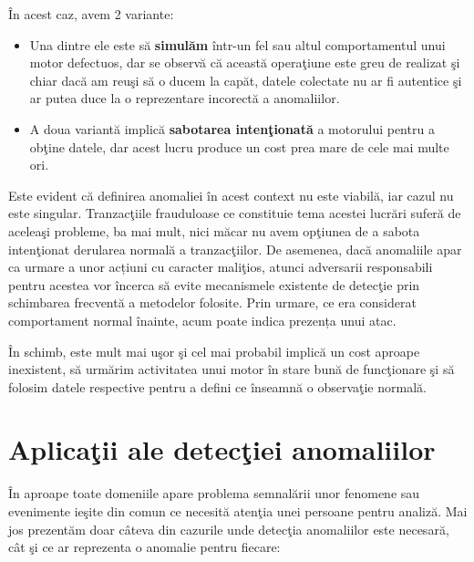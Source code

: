 În acest caz, avem 2 variante:
\begin{itemize}
    \item Una dintre ele 
        este să \textbf{simulăm} 
        într-un fel sau altul comportamentul unui motor defectuos, dar 
        se observă că această operaţiune este greu de realizat şi chiar dacă am reuşi 
        să o ducem la capăt, datele colectate nu ar fi autentice şi ar putea duce 
        la o reprezentare incorectă a anomaliilor. 

    \item A doua variantă implică \textbf{sabotarea 
        intenţionată} a motorului pentru a obţine datele, dar acest lucru produce un 
        cost prea mare de cele mai multe ori. 
\end{itemize}

Este evident că definirea anomaliei în acest context nu este viabilă, iar 
cazul nu este singular. Tranzacţiile frauduloase ce constituie tema acestei lucrări 
suferă de aceleaşi probleme, ba mai mult, nici măcar nu avem opţiunea de a 
sabota intenţionat derularea normală a tranzacţiilor. De asemenea,
dacă anomaliile apar ca urmare a unor acțiuni cu caracter maliţios,
atunci adversarii responsabili pentru acestea vor încerca să 
evite mecanismele existente de detecţie prin schimbarea 
frecventă a metodelor folosite. Prin urmare, ce era considerat
comportament normal înainte, acum poate indica prezența unui 
atac.


În schimb, 
este mult mai uşor şi cel mai probabil 
implică un cost aproape inexistent, să urmărim activitatea unui motor 
în stare bună de funcţionare şi să folosim datele respective pentru a 
defini ce înseamnă o observaţie normală.

\section{Aplicaţii ale detecţiei anomaliilor}

În aproape toate domeniile apare problema semnalării unor fenomene sau evenimente 
ieşite din comun ce necesită atenţia unei persoane pentru analiză. Mai jos prezentăm
doar câteva din cazurile unde detecţia anomaliilor este necesară, cât şi ce ar 
reprezenta o anomalie pentru fiecare:

